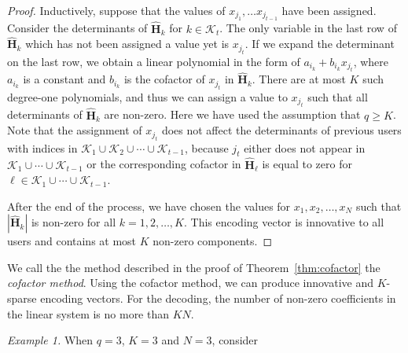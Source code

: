 \documentclass[letterpaper,conference,10pt]{IEEEtran}
\begin{document}
\begin{proof}
Inductively, suppose that the values of $x_{j_1}, \ldots x_{j_{t-1}}$ have been assigned. Consider the determinants of $\hat{\mathbf{H}}_k$ for $k\in \mathcal{K}_t$. The only variable in the last row of $\hat{\mathbf{H}}_k$ which has not been assigned a value yet is $x_{j_t}$. If we expand the determinant on the last row, we obtain a linear polynomial in the form of $a_{i_k} + b_{i_k}x_{j_t}$, where $a_{i_k}$ is a constant and $b_{i_k}$ is the cofactor of $x_{j_t}$ in $\hat{\mathbf{H}}_k$. There are at most $K$ such degree-one polynomials, and thus we can assign a value to $x_{j_t}$ such that all determinants of $\hat{\mathbf{H}}_k$ are non-zero. Here we have used the assumption that $q \geq K$. Note that the assignment of $x_{j_t}$ does not affect the determinants of previous users with indices in $\mathcal{K}_1  \cup \mathcal{K}_2 \cup \cdots \cup \mathcal{K}_{t-1}$, because $j_t$ either does not appear in $\mathcal{K}_1  \cup \cdots \cup \mathcal{K}_{t-1}$ or the corresponding cofactor in $\hat{\mathbf{H}}_\ell$ is equal to zero for $\ell\in \mathcal{K}_1  \cup \cdots \cup \mathcal{K}_{t-1}$.

After the end of the process, we have chosen the values for $x_1,x_2,\ldots, x_N$ such that $|\hat{\mathbf{H}}_k|$ is non-zero for all $k=1,2,\ldots, K$. This encoding vector is innovative to all users and contains at most $K$ non-zero components.
\end{proof}

We call the the method described in the proof of Theorem~\ref{thm:cofactor} the {\em cofactor method}. Using the cofactor method, we can produce innovative and $K$-sparse encoding vectors. For the decoding, the number of non-zero coefficients in the linear system is no more than $KN$.



{\em Example 1.}
When $q=3$, $K=3$ and $N=3$, consider

\vspace{-0.5cm}
\end{document}

